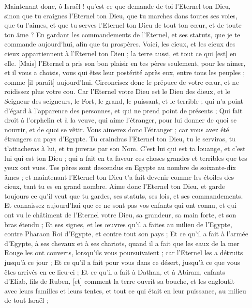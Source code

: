 \begin{multicols}{2}
Maintenant donc, ô Israël ! qu'est-ce que demande de toi l'Eternel ton Dieu, sinon que tu craignes l'Eternel ton Dieu, que tu marches dans toutes ses voies, que tu l'aimes, et que tu serves l'Eternel ton Dieu de tout ton cœur, et de toute ton âme ?
En gardant les commandements de l'Eternel, et ses statuts, que je te commande aujourd'hui, afin que tu prospères.
Voici, les cieux, et les cieux des cieux appartiennent à l'Eternel ton Dieu ; la terre aussi, et tout ce qui [est] en elle.
[Mais] l'Eternel a pris son bon plaisir en tes pères seulement, pour les aimer, et il vous a choisis, vous qui êtes leur postérité après eux, entre tous les peuples ; comme [il paraît] aujourd'hui.
Circoncisez donc le prépuce de votre cœur, et ne roidissez plus votre cou.
Car l'Eternel votre Dieu est le Dieu des dieux, et le Seigneur des seigneurs, le Fort, le grand, le puissant, et le terrible ; qui n'a point d'égard à l'apparence des personnes, et qui ne prend point de présents ;
Qui fait droit à l'orphelin et à la veuve, qui aime l'étranger, pour lui donner de quoi se nourrir, et de quoi se vêtir.
Vous aimerez donc l'étranger ; car vous avez été étrangers au pays d'Egypte.
Tu craindras l'Eternel ton Dieu, tu le serviras, tu t'attacheras à lui, et tu jureras par son Nom.
C'est lui qui est ta louange, et c'est lui qui est ton Dieu ; qui a fait en ta faveur ces choses grandes et terribles que tes yeux ont vues.
Tes pères sont descendus en Egypte au nombre de soixante-dix âmes ; et maintenant l'Eternel ton Dieu t'a fait devenir comme les étoiles des cieux, tant tu es en grand nombre.
\VerseOne{}Aime donc l'Eternel ton Dieu, et garde toujours ce qu'il veut que tu gardes, ses statuts, ses lois, et ses commandements.
Et connaissez aujourd'hui que ce ne sont pas vos enfants qui ont connu, et qui ont vu le châtiment de l'Eternel votre Dieu, sa grandeur, sa main forte, et son bras étendu ;
Et ses signes, et les œuvres qu'il a faites au milieu de l'Egypte, contre Pharaon Roi d'Egypte, et contre tout son pays ;
Et ce qu'il a fait à l'armée d'Egypte, à ses chevaux et à ses chariots, quand il a fait que les eaux de la mer Rouge les ont couverts, lorsqu'ils vous poursuivaient ; car l'Eternel les a détruits jusqu'à ce jour ;
Et ce qu'il a fait pour vous dans ce désert, jusqu'à ce que vous êtes arrivés en ce lieu-ci ;
Et ce qu'il a fait à Dathan, et à Abiram, enfants d'Eliab, fils de Ruben, [et] comment la terre ouvrit sa bouche, et les engloutit avec leurs familles et leurs tentes, et tout ce qui était en leur puissance, au milieu de tout Israël ;

\end{multicols}
